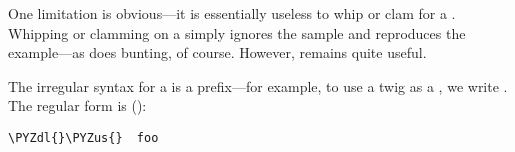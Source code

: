 One limitation is obvious---it is essentially useless to whip or
clam for a .  Whipping or clamming on a  simply
ignores the sample and reproduces the example---as does bunting,
of course.  However,  remains quite useful.

The irregular syntax for a  is a \kode{\_} prefix---for example,
to use a twig  as a , we write .  The regular
form is \kode{\$\_} ():

\begin{framed_shaded}
\begin{Verbatim}[fontsize=\relsize{-2.5},fontseries=b,commandchars=\\\{\}]
\PYZdl{}\PYZus{}  foo
\end{Verbatim}
\end{framed_shaded}